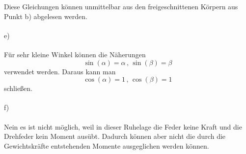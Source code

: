 Diese Gleichungen können unmittelbar aus den freigeschnittenen Körpern aus Punkt b) abgelesen werden.\\ \\
e)\\ \\
Für sehr kleine Winkel können die Näherungen 
\[
	\sin(\alpha) = \alpha \, , \, \sin(\beta) = \beta
\]
verwendet werden. Daraus kann man 
\[
\cos(\alpha) = 1 \, , \, \cos(\beta) = 1
\]
schließen.\\ \\
f)\\ \\
Nein es ist nicht möglich, weil in dieser Ruhelage die Feder keine Kraft und die Drehfeder kein Moment ausübt. Dadurch können aber nicht die durch die Gewichtskräfte entstehenden Momente ausgeglichen werden können.